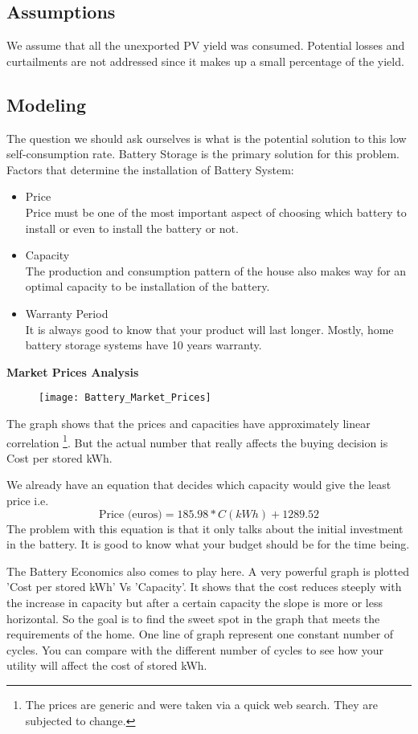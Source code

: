 \documentclass[oneside]{book}
\begin{document}
\subsection{Assumptions}
We assume that all the unexported PV yield was consumed. Potential losses and curtailments are not addressed since it makes up a small percentage of the yield. 
\subsection{Modeling}
The question we should ask ourselves is what is the potential solution to this low self-consumption rate. Battery Storage is the primary solution for this problem. \\
Factors that determine the installation of Battery System:
\begin{itemize}
\item Price\\
Price must be one of the most important aspect of choosing which battery to install or even to install the battery or not.
\item Capacity\\
The production and consumption pattern of the house also makes way for an optimal capacity to be installation of the battery.
\item Warranty Period\\
It is always good to know that your product will last longer. Mostly, home battery storage systems have 10 years warranty.
\end{itemize}

\textbf{Market Prices Analysis}
\begin{figure}[h]
\texttt{[image: Battery\_Market\_Prices]}
\centering
\end{figure}


The graph shows that the prices and capacities have approximately linear correlation \footnote{The prices are generic and were taken via a quick web search. They are subjected to change.}. But the actual number that really affects the buying decision is Cost per stored kWh.

We already have an equation that decides which capacity would give the least price i.e. \[ \text{Price (euros)}=185.98* C (kWh) +1289.52 \] The problem with this equation is that it only talks about the initial investment in the battery. It is good to know what your budget should be for the time being. 

The Battery Economics also comes to play here. A very powerful graph is plotted 'Cost per stored kWh' Vs 'Capacity'. It shows that the cost reduces steeply with the increase in capacity but after a certain capacity the slope is more or less horizontal. So the goal is to find the sweet spot in the graph that meets the requirements of the home. One line of graph represent one constant number of cycles. You can compare with the different number of cycles to see how your utility will affect the cost of stored kWh. 
\end{document}
